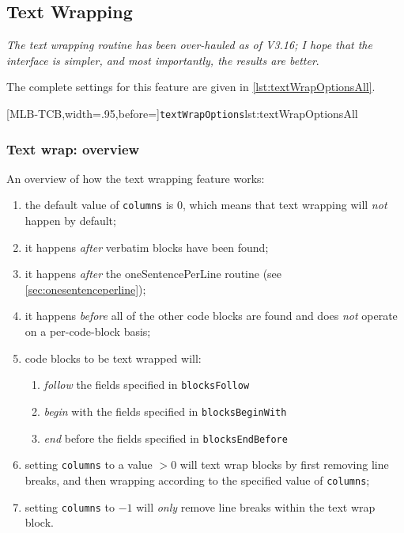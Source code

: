 \subsection{Text Wrapping}\label{subsec:textwrapping}
	\emph{The text wrapping routine has been over-hauled as
	of V3.16; I hope that the interface is simpler, and most importantly, the results are
	better}.

	The complete settings for this feature are given in \cref{lst:textWrapOptionsAll}.

	[MLB-TCB,width=.95\linewidth,before=\centering]{\texttt{textWrapOptions}}{lst:textWrapOptionsAll}

\subsubsection{Text wrap: overview}
	An overview of how the text wrapping feature works:
	\begin{enumerate}
		\item the default value of \texttt{columns} is 0, which means that text wrapping will
		      \emph{not} happen by default;
		\item it happens \emph{after} verbatim blocks have been found;
		\item it happens \emph{after} the oneSentencePerLine routine (see
		      \cref{sec:onesentenceperline});
		\item it happens \emph{before} all of the other code blocks are found and does \emph{not}
		      operate on a per-code-block basis;
		\item code blocks to be text wrapped will:
		      \begin{enumerate}
			      \item \emph{follow} the fields specified in \texttt{blocksFollow}
			      \item \emph{begin} with the fields specified in \texttt{blocksBeginWith}
			      \item \emph{end} before the fields specified in \texttt{blocksEndBefore}
		      \end{enumerate}
		\item setting \texttt{columns} to a value $>0$ will text wrap blocks by first removing line
		      breaks, and then wrapping according to the specified value of \texttt{columns};
		\item setting \texttt{columns} to $-1$ will \emph{only} remove line breaks within the text wrap
		      block.
	\end{enumerate}

